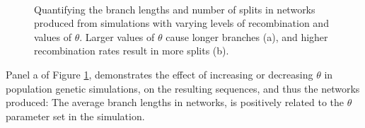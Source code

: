 \begin{figure}
\centering
{}\\
\caption{Quantifying the branch lengths and number of splits in networks produced from simulations with varying levels of recombination and values of $\theta$.
Larger values of $\theta$ cause longer branches (a), and higher recombination rates result in more splits (b).\label{fig:relgraphs}}
\end{figure}

Panel a of Figure \ref{fig:relgraphs}, demonstrates the effect of increasing or decreasing $\theta$ in population genetic simulations, on the resulting sequences, and thus the networks produced:
The average branch lengths in networks, is positively related to the $\theta$ parameter set in the simulation.

